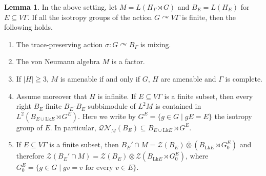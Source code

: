 \documentclass{amsart}
\theoremstyle{definition}
\newtheorem{lemma}[theorem]{Lemma}
\renewcommand{\subset}{\subseteq}
\begin{document}
\begin{lemma}
In the above setting, let $M=L(H_{\Gamma}\rtimes G)$ and $B_E=L(H_E)$ for $E\subset V\Gamma$. If all the isotropy groups of the action $G\curvearrowright V\Gamma$
is finite, then the following holds. 
\begin{enumerate}
\item The trace-preserving action 
$\sigma: G\curvearrowright B_{\Gamma}$
is mixing. 

\item The von Neumann algebra $M$ is a factor. 

\item If $|H|\geqq 3$, $M$ is amenable if and only if $G$, $H$ are amenable and $\Gamma$ is complete. 
 

\item Assume moreover that $H$ is infinite. If $E\subset V\Gamma$ is a finite subset, then every right $B_E$-finite $B_E$-$B_E$-subbimodule of $L^2M$ is contained in $L^2(B_{E\cup \mathrm{Lk}E}\rtimes G^E)$. Here we write by $G^E=\{ g\in G \mid gE=E\}$ the isotropy group of $E$.
In particular, $\mathcal{QN}_M(B_E)\subset B_{E\cup \mathrm{Lk}E}\rtimes G^E$. 

\item If $E\subset V\Gamma$ is a finite subset, then $B_E'\cap M =\mathcal{Z}(B_E) \overline{\otimes}(B_{\mathrm{Lk}E}\rtimes G_0^E)$ and therefore $\mathcal{Z}(B_E'\cap M) = \mathcal{Z}(B_E) \overline{\otimes}\mathcal{Z}(B_{\mathrm{Lk}E}\rtimes G_0^E) $, where $G_0^E=\{ g\in G\mid gv=v \text { for every }v\in E\}$. 

\end{enumerate}
\end{lemma}
\end{document}
